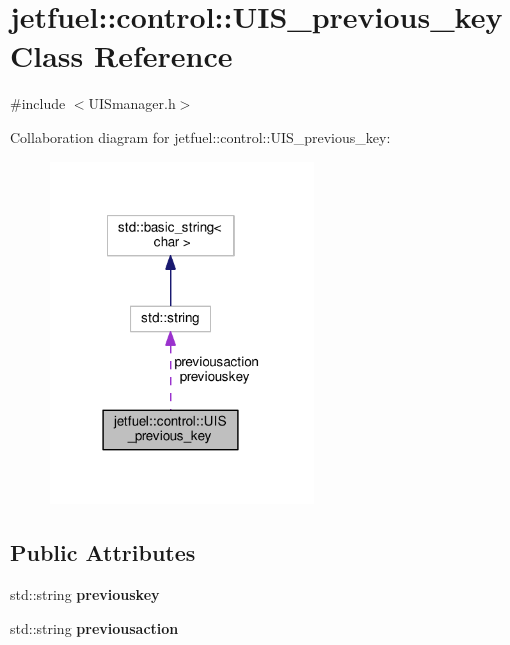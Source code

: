 \hypertarget{structjetfuel_1_1control_1_1UIS__previous__key}{}\section{jetfuel\+:\+:control\+:\+:U\+I\+S\+\_\+previous\+\_\+key Class Reference}
\label{structjetfuel_1_1control_1_1UIS__previous__key}


{\ttfamily \#include $<$U\+I\+Smanager.\+h$>$}



Collaboration diagram for jetfuel\+:\+:control\+:\+:U\+I\+S\+\_\+previous\+\_\+key\+:\nopagebreak
\begin{figure}[H]
\begin{center}
\leavevmode
\includegraphics[width=198pt]{structjetfuel_1_1control_1_1UIS__previous__key__coll__graph}
\end{center}
\end{figure}
\subsection*{Public Attributes}
\begin{DoxyCompactItemize}
\item 
\mbox{\label{structjetfuel_1_1control_1_1UIS__previous__key_a9cc6e0c22eee2446599cbe475c81ee03}} 
std\+::string {\bfseries previouskey}
\item 
\mbox{\label{structjetfuel_1_1control_1_1UIS__previous__key_a89689b08b374da05359b8c667bf0dec9}} 
std\+::string {\bfseries previousaction}
\end{DoxyCompactItemize}


